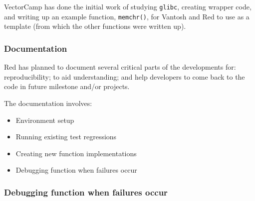 VectorCamp has done the initial work of studying \texttt{glibc},
creating wrapper code, and writing up an example function, \texttt{memchr()},
for Vantosh and Red to use as a template (from which the other functions were
written up).

\subsubsection{Documentation}

Red has planned to document several critical parts of the developments for:
reproducibility; to aid understanding; and help developers to come back to
the code in future milestone and/or projects.

The documentation involves:

\begin{itemize}
  \item Environment setup
  \item Running existing test regressions
  \item Creating new function implementations
  \item Debugging function when failures occur
\end{itemize}







\subsubsection{Debugging function when failures occur}
